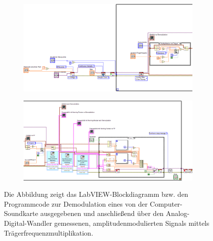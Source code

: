 \documentclass[
a4paper,
12pt,
pagesize,
ngerman
]{scrartcl}
\begin{document}
	\begin{figure}[H]
		\centering
		\begin{subfigure}[t]{0.91\textwidth}
			\centering
			\includegraphics[width=1.0\textwidth]{EIRE2018Dateien/Tag4/traegerMultOszi/Oszilloskop__modifiziertdTeil1}
		\end{subfigure}
		
		\vspace{0,2cm}
		
		\begin{subfigure}[t]{1.0\textwidth}
			\centering
			\includegraphics[width=1.0\textwidth]{EIRE2018Dateien/Tag4/traegerMultOszi/Oszilloskop__modifiziertdTeil2}
		\end{subfigure}
		\caption{Die Abbildung zeigt das LabVIEW-Blockdiagramm bzw. den Programmcode zur Demodulation eines von der Computer-Soundkarte ausgegebenen und anschließend über den Analog-Digital-Wandler gemessenen, amplitudenmodulierten Signals mittels Trägerfrequenzmultiplikation.}
		\label{MultiTraegerProgrammcode}
	\end{figure}
	
\end{document}
